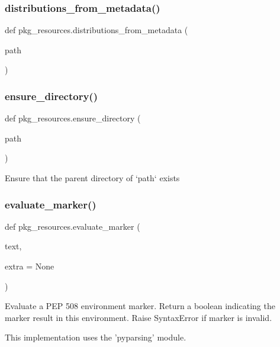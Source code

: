 \subsubsection{\texorpdfstring{distributions\+\_\+from\+\_\+metadata()}{distributions\_from\_metadata()}}
{\footnotesize\ttfamily def pkg\+\_\+resources.\+distributions\+\_\+from\+\_\+metadata (\begin{DoxyParamCaption}\item[{}]{path }\end{DoxyParamCaption})}

\mbox{\label{namespacepkg__resources_a184f9bf0699b317e84046c58d6b224cf}} 
\subsubsection{\texorpdfstring{ensure\+\_\+directory()}{ensure\_directory()}}
{\footnotesize\ttfamily def pkg\+\_\+resources.\+ensure\+\_\+directory (\begin{DoxyParamCaption}\item[{}]{path }\end{DoxyParamCaption})}

\begin{DoxyVerb}Ensure that the parent directory of `path` exists\end{DoxyVerb}
 \mbox{\label{namespacepkg__resources_a02ab4b058591e3461dc3653dc9a0c01d}} 
\subsubsection{\texorpdfstring{evaluate\+\_\+marker()}{evaluate\_marker()}}
{\footnotesize\ttfamily def pkg\+\_\+resources.\+evaluate\+\_\+marker (\begin{DoxyParamCaption}\item[{}]{text,  }\item[{}]{extra = {\ttfamily None} }\end{DoxyParamCaption})}

\begin{DoxyVerb}Evaluate a PEP 508 environment marker.
Return a boolean indicating the marker result in this environment.
Raise SyntaxError if marker is invalid.

This implementation uses the 'pyparsing' module.
\end{DoxyVerb}
 \mbox{\label{namespacepkg__resources_ac4760ef4501d5e05f68cf9fef9af1cbe}} 
